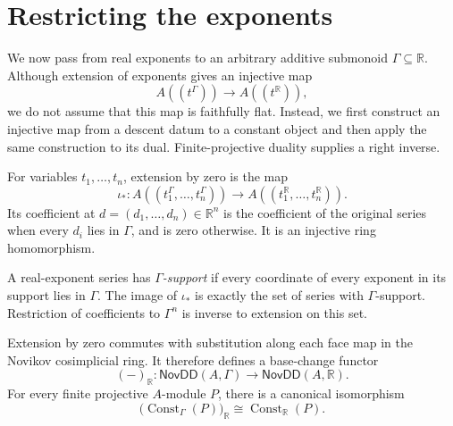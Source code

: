 \section{Restricting the exponents}
\label{sec:exponent_restriction}

We now pass from real exponents to an arbitrary additive submonoid
$\Gamma\subseteq\mathbb{R}$.  Although extension of exponents gives an
injective map
\[
  A((t^\Gamma))\longrightarrow A((t^{\mathbb{R}})),
\]
we do not assume that this map is faithfully flat.  Instead, we first
construct an injective map from a descent datum to a constant object and then
apply the same construction to its dual.  Finite-projective duality supplies a
right inverse.

\begin{definition}
  \label{def:exponent_extension}
  \leanok
  For variables $t_1,\ldots,t_n$, extension by zero is the map
  \[
    \iota_*\colon A((t_1^\Gamma,\dotsc,t_n^\Gamma))
      \longrightarrow A((t_1^{\mathbb{R}},\dotsc,t_n^{\mathbb{R}})).
  \]
  Its coefficient at $d=(d_1,\ldots,d_n)\in\mathbb{R}^n$ is the coefficient
  of the original series when every $d_i$ lies in $\Gamma$, and is zero
  otherwise.  It is an injective ring homomorphism.

  A real-exponent series has \emph{$\Gamma$-support} if every coordinate of
  every exponent in its support lies in $\Gamma$.  The image of $\iota_*$ is
  exactly the set of series with $\Gamma$-support.  Restriction of coefficients
  to $\Gamma^n$ is inverse to extension on this set.
\end{definition}

\begin{proposition}
  \label{prop:exponent_base_change}
  \leanok
  Extension by zero commutes with substitution along each face map in the
  Novikov cosimplicial ring.  It therefore defines a base-change functor
  \[
    (-)_{\mathbb{R}}\colon
      \mathsf{NovDD}(A,\Gamma)\longrightarrow
      \mathsf{NovDD}(A,\mathbb{R}).
  \]
  For every finite projective $A$-module $P$, there is a canonical
  isomorphism
  \[
    \bigl(\operatorname{Const}_\Gamma(P)\bigr)_{\mathbb{R}}
      \cong \operatorname{Const}_{\mathbb{R}}(P).
  \]
\end{proposition}

